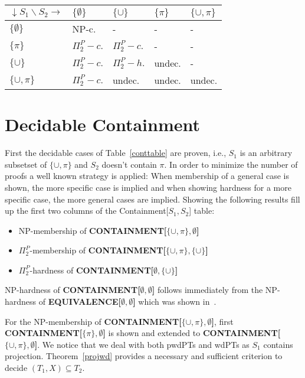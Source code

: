 \bigskip
\begin{table}
	\begin{minipage}[b]{0.5\hsize}
\begin{tabular}{|l |  l | l | l | l|}
	\hline
	$\downarrow S_1 \backslash S_2 \rightarrow$ & $\{\emptyset\}$ &
	$\{\cup\}$& $\{\pi \}$ & $\{\cup,\pi \}$ \\
	\hline
	$\{\emptyset\}$			&  NP-c.				& -				 & -         & - \\
	$\{\pi \}$		&  $\Pi^P_2-c.$ 		& $\Pi^P_2-c.$   & -		 & - \\
	$\{\cup \}$		&  $\Pi^P_2-c.$ 		& $\Pi^P_2-h.$   & undec.    & - \\
	$\{\cup,\pi \}$&  $\Pi^P_2-c.$ 		& undec.         & undec.    & undec. \\
\hline
\end{tabular}
\label{equivtable}
	\end{minipage}
\end{table}


\section{Decidable Containment}\label{section:decidablecontainment}

First the decidable cases of Table~\ref{conttable} are proven, i.e., $S_1$ is an arbitrary subsetset of
$\{\cup,\pi\}$ and $S_2$ doesn't contain $\pi$. 
In order to minimize the number of proofs a well known strategy is applied: When membership of a
general case is shown, the more specific case is implied and when showing
hardness for a more specific case, the more general cases are implied.  
Showing the following results fill up the first two columns of the
Containment[$S_1,S_2$] table:
\begin{itemize}
	\item NP-membership of \textbf{CONTAINMENT[$\{\cup,\pi\},\emptyset$]}
	\item $\Pi^P_2$-membership of \textbf{CONTAINMENT[$\{\cup,\pi\},\{\cup\}$]}
	\item $\Pi^P_2$-hardness of \textbf{CONTAINMENT[$\emptyset,\{\cup\}$]}
\end{itemize}
NP-hardness of \textbf{CONTAINMENT[$\emptyset,\emptyset$]} follows immediately
from the NP-hardness of \textbf{EQUIVALENCE[$\emptyset,\emptyset$]} which was shown
in~\cite{letelier2013static}.

For the NP-membership of \textbf{CONTAINMENT[$\{\cup,\pi \}, \emptyset$]}, 
first \textbf{CONTAINMENT[$\{\pi\} , \emptyset$]} is shown and extended to 
\textbf{CONTAINMENT[$\{\cup,\pi \}, \emptyset$]}. We notice that we deal with
both pwdPTs and wdPTs as $S_1$ contains projection. Theorem~\ref{projwd} provides a
necessary and sufficient criterion to decide $(T_1,X) \subseteq T_2$.


